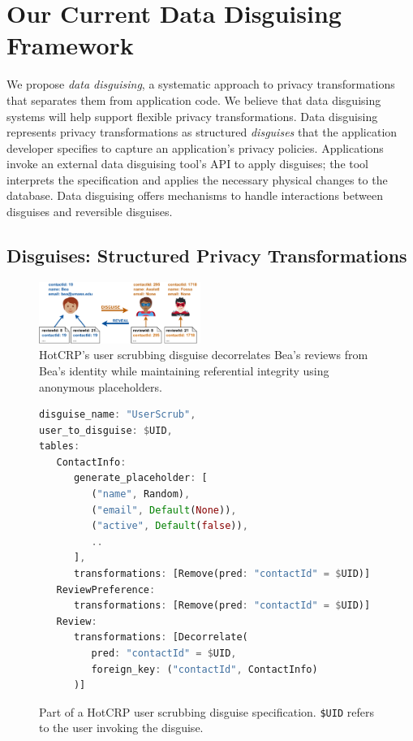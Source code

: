 \section{Our Current Data Disguising Framework}

We propose \emph{data disguising}, a systematic approach to privacy transformations
that separates them from application code.
%
We believe that data disguising systems will help support flexible privacy
transformations.
%
Data disguising represents privacy transformations as structured \emph{disguises}
that the application developer specifies to capture an application's privacy policies.
%
Applications invoke an external data disguising tool's API to apply disguises; the tool
interprets the specification and applies the necessary physical changes to the
database.
%
Data disguising offers mechanisms to handle interactions between disguises and
reversible disguises.

%
%

\subsection{Disguises: Structured Privacy Transformations}
\label{sec:disguises}

\begin{figure}[t]
    \centering
    \includegraphics[width=0.47\textwidth]{img/disguises_new}

    \caption{HotCRP's user scrubbing disguise decorrelates Bea's reviews from Bea's identity while maintaining
    referential integrity using anonymous placeholders.}
    \label{fig:example}
\end{figure}

\begin{figure}[t!]
    \centering
    \footnotesize
\begin{lstlisting}[language=Rust]
disguise_name: "UserScrub",
user_to_disguise: $UID,
tables:
   ContactInfo:
      generate_placeholder: [
         ("name", Random),
         ("email", Default(None)),
         ("active", Default(false)),
         ..
      ],
      transformations: [Remove(pred: "contactId" = $UID)]
   ReviewPreference:
      transformations: [Remove(pred: "contactId" = $UID)]
   Review:
      transformations: [Decorrelate(
         pred: "contactId" = $UID,
         foreign_key: ("contactId", ContactInfo)
      )]
\end{lstlisting}
    \caption{Part of a HotCRP user scrubbing disguise specification. \texttt{\$UID} refers
    to the user invoking the disguise.}
    \label{fig:spec}
\end{figure}

